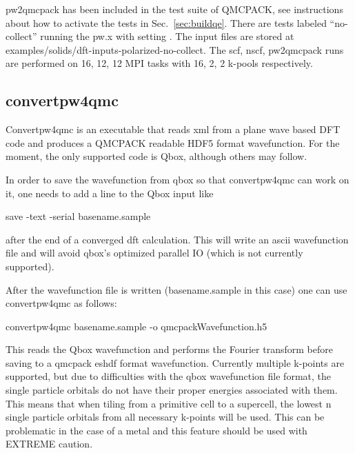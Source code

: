 pw2qmcpack has been included in the test suite of QMCPACK, see instructions about how to activate the tests in Sec.~\ref{sec:buildqe}.
There are tests labeled ``no-collect'' running the pw.x with setting .
The input files are stored at examples/solids/dft-inputs-polarized-no-collect.
The scf, nscf, pw2qmcpack runs are performed on 16, 12, 12 MPI tasks with 16, 2, 2 k-pools respectively.

\subsection{convertpw4qmc}
Convertpw4qmc is an executable that reads xml from a plane wave based DFT code and produces a QMCPACK readable 
HDF5 format wavefunction.  For the moment, the only supported code is Qbox, although others may follow.

In order to save the wavefunction from qbox so that convertpw4qmc can work on it, one needs to add a line to the
Qbox input like
\begin{shade}
save -text -serial basename.sample
\end{shade}
after the end of a converged dft calculation.  This will write an ascii wavefunction file and will avoid
qbox's optimized parallel IO (which is not currently supported).

After the wavefunction file is written (basename.sample in this case) one can use convertpw4qmc as follows:
\begin{shade}
convertpw4qmc basename.sample -o qmcpackWavefunction.h5
\end{shade}

This reads the Qbox wavefunction and performs the Fourier transform before saving to a qmcpack eshdf format wavefunction.  Currently multiple k-points are supported, but due to difficulties with the qbox wavefunction file format, the single particle orbitals do not have their proper energies associated with them.  This means that when tiling from a primitive cell to a supercell, the lowest n single particle orbitals from all necessary k-points will be used.  This can be problematic in the case of a metal and this feature should be used with EXTREME caution.


